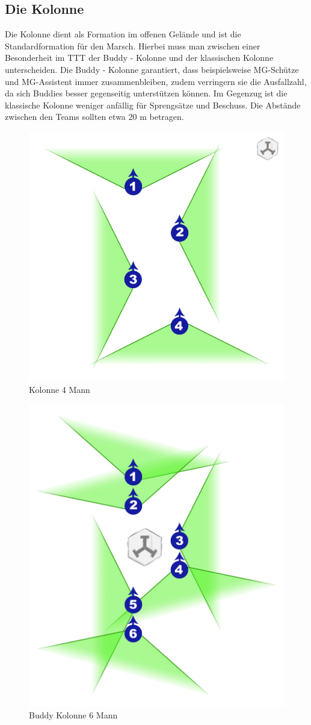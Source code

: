 \subsection{Die Kolonne}
Die Kolonne dient als Formation im offenen Gelände und ist die Standardformation für den Marsch. Hierbei muss man zwischen einer Besonderheit im \ac{TTT} der Buddy - Kolonne und der klassischen Kolonne unterscheiden. Die Buddy - Kolonne garantiert, dass beispielsweise MG-Schütze und MG-Assistent immer zusammenbleiben, zudem verringern sie die Ausfallzahl, da sich Buddies besser gegenseitig unterstützen können. Im Gegenzug ist die klassische Kolonne weniger anfällig für Sprengsätze und Beschuss. Die Abstände zwischen den Teams sollten etwa 20 m betragen.\\
\begin{figure}[htbp]
	\centering
	\includegraphics[width=0.5\linewidth]{./img/grundlagen/formationen/kolonne_4mann.jpg}
 \caption{Kolonne 4 Mann}
\end{figure}
\begin{figure}[htbp]
	\centering
	\includegraphics[width=0.5\linewidth]{./img/grundlagen/formationen/kolonne_6mann.jpg}
	\caption{Buddy Kolonne 6 Mann}
\end{figure}

